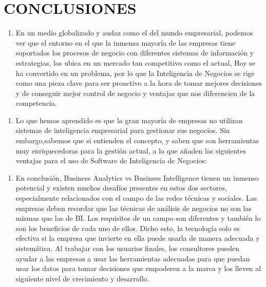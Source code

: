 \section{CONCLUSIONES} 
\begin{enumerate}[1.]
	\item En un medio globalizado y audaz como el del mundo empresarial, podemos ver que el entorno en el que la inmensa mayor\'ia de las empresas tiene soportados los procesos de negocio con diferentes sistemas de informaci\'on y estrategias, los ubica en un mercado tan competitivo como el actual, Hoy se ha convertido en un problema, por lo que la Inteligencia de Negocios se rige como una pieza clave para ser proactivo a la hora de tomar mejores decisiones y de conseguir mejor control de negocio y ventajas que nos diferencien de la competencia.
\end{enumerate}

\begin{enumerate}[2.]
 	\item Lo que hemos aprendido es que la gran mayor\'ia de empresas no utilizan sistemas de inteligencia empresarial para gestionar sus negocios. Sin embargo,sabemos que si entienden el concepto, y saben que son herramientas muy enriquecedoras para la gesti\'on actual, a lo que añaden las siguientes ventajas para el  uso de Software de Inteligencia de Negocios:
\end{enumerate}

\begin{enumerate}[3.]
	\item En conclusi\'on, Business Analytics vs Business Intelligence tienen un inmenso potencial y existen muchos desaf\'ios presentes en estos dos sectores, especialmente relacionados con el campo de las redes t\'ecnicas y sociales. Las empresas deben recordar que las t\'ecnicas de an\'alisis de negocios no son las mismas que las de BI. Los requisitos de un campo son diferentes y tambi\'en lo son los beneficios de cada uno de ellos. Dicho esto, la tecnolog\'ia solo es efectiva si la empresa que invierte en ella puede usarla de manera adecuada y sistem\'atica. Al trabajar con los usuarios finales, los consultores pueden ayudar a las empresas a usar las herramientas adecuadas para que puedan usar los datos para tomar decisiones que empoderen a la marca y los lleven al siguiente nivel de crecimiento y desarrollo.
\end{enumerate}
